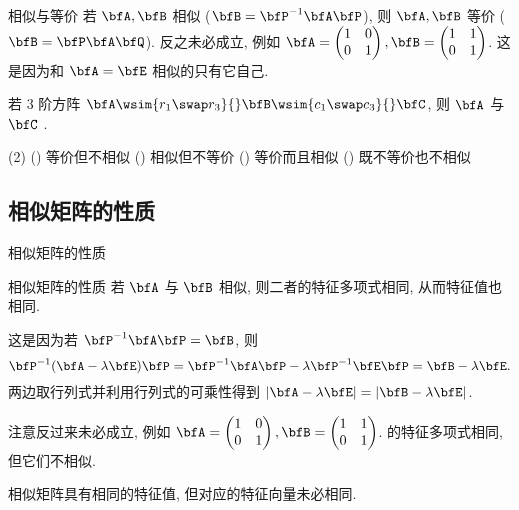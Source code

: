 \begin{frame}{相似与等价}
	\onslide<+->
	若 $\bfA,\bfB$ 相似 ($\bfB=\bfP^{-1}\bfA\bfP$), 则 $\bfA,\bfB$ 等价 ($\bfB=\bfP\bfA\bfQ$).
		反之未必成立, 例如 $\bfA=\begin{pmatrix}
			1&0\\
			0&1
		\end{pmatrix}, \bfB=\begin{pmatrix}
			1&1\\
			0&1
		\end{pmatrix}$.
		这是因为和 $\bfA=\bfE$ 相似的只有它自己.
	\onslide<+->
	\begin{example}
		若 $3$ 阶方阵 $\bfA\wsim{r_1\swap r_3}{}\bfB\wsim{c_1\swap c_3}{}\bfC$, 则 $\bfA$ 与 $\bfC$ .
		\begin{taskschoice}(2)
			() 等价但不相似
			() 相似但不等价
			() 等价而且相似
			() 既不等价也不相似
		\end{taskschoice}
	\end{example}
\end{frame}


\subsection{相似矩阵的性质}

\begin{frame}{相似矩阵的性质}
	\onslide<+->
	\begin{algorithm}{相似矩阵的性质}
		若 $\bfA$ 与 $\bfB$ 相似, 则二者的特征多项式相同, 从而特征值也相同.
	\end{algorithm}
	\onslide<+->
	这是因为若 $\bfP^{-1}\bfA\bfP=\bfB$, 则
	\[\bfP^{-1}(\bfA-\lambda\bfE)\bfP=\bfP^{-1}\bfA\bfP-\lambda\bfP^{-1}\bfE\bfP=\bfB-\lambda\bfE.\]
	\onslide<+->
	两边取行列式并利用行列式的可乘性得到 $|\bfA-\lambda\bfE|=|\bfB-\lambda\bfE|$.

	\onslide<+->
	注意反过来未必成立, 例如 $\bfA=\begin{pmatrix}
		1&0\\
		0&1
	\end{pmatrix}, \bfB=\begin{pmatrix}
		1&1\\
		0&1
	\end{pmatrix}$.
	的特征多项式相同, 但它们不相似.

	\onslide<+->
	相似矩阵具有相同的特征值, 但对应的特征向量未必相同.
\end{frame}


